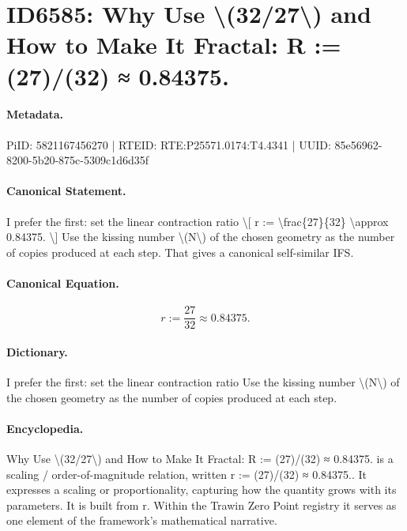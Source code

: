 \section*{ID6585: Why Use \textbackslash{}(32/27\textbackslash{}) and How to Make It Fractal: R := (27)/(32) ≈ 0.84375.}
\paragraph{Metadata.}
PiID: 5821167456270 | RTEID: RTE:P25571.0174:T4.4341 | UUID: 85e56962-8200-5b20-875c-5309c1d6d35f

\paragraph{Canonical Statement.}
I prefer the first: set the linear contraction ratio \textbackslash{}[ r := \textbackslash{}frac\{27\}\{32\} \textbackslash{}approx 0.84375. \textbackslash{}] Use the kissing number \textbackslash{}(N\textbackslash{}) of the chosen geometry as the number of copies produced at each step. That gives a canonical self-similar IFS.

\paragraph{Canonical Equation.}
\[
r := \frac{27}{32} \approx 0.84375.
\]

\paragraph{Dictionary.}
I prefer the first: set the linear contraction ratio Use the kissing number \textbackslash{}(N\textbackslash{}) of the chosen geometry as the number of copies produced at each step.

\paragraph{Encyclopedia.}
Why Use \textbackslash{}(32/27\textbackslash{}) and How to Make It Fractal: R := (27)/(32) ≈ 0.84375. is a scaling / order-of-magnitude relation, written r := (27)/(32) ≈ 0.84375.. It expresses a scaling or proportionality, capturing how the quantity grows with its parameters. It is built from r. Within the Trawin Zero Point registry it serves as one element of the framework's mathematical narrative.
